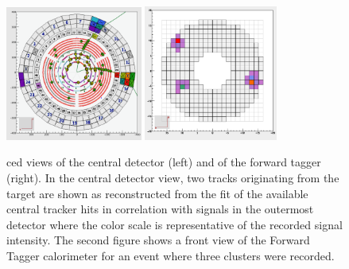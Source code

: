 \begin{figure}
\centering
\includegraphics[width=0.4\textwidth]{pics/ced_central.png}
\includegraphics[width=0.39\textwidth]{pics/ced_ft.png}
\caption{ced views of the central detector (left) and of the forward tagger (right). In the central detector view, two tracks originating from the target are shown as reconstructed from the fit of the available central tracker hits in correlation with signals in the outermost detector where the color scale is representative of the recorded signal intensity. The second figure shows a front view of the Forward Tagger calorimeter for an event where three clusters were recorded.
}
\label{fig:ced}
\end{figure}


